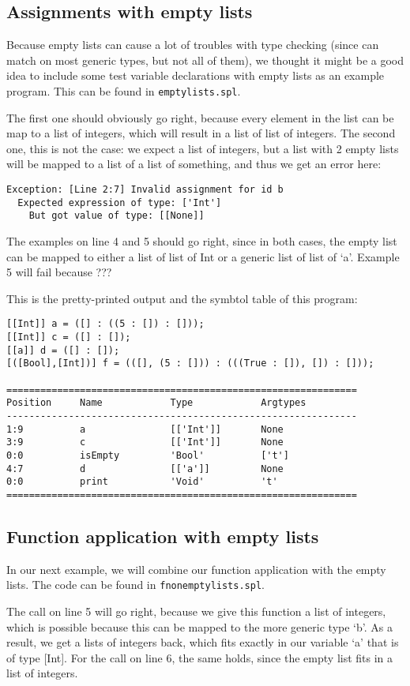 \documentclass[a4paper]{article}
\begin{document}
\subsection{Assignments with empty lists}
Because empty lists can cause a lot of troubles with type checking (since can match on most generic types, but not all of them), we thought it might be a good idea to include some test variable declarations with empty lists as an example program. This can be found in {\tt emptylists.spl}. 

The first one should obviously go right, because every element in the list can be map to a list of integers, which will result in a list of list of integers. The second one, this is not the case: we expect a list of integers, but a list with 2 empty lists will be mapped to a list of a list of something, and thus we get an error here: 
\begin{verbatim}
Exception: [Line 2:7] Invalid assignment for id b
  Expected expression of type: ['Int']
    But got value of type: [[None]]
\end{verbatim}
The examples on line 4 and 5 should go right, since in both cases, the empty list can be mapped to either a list of list of Int or a generic list of list of `a'. Example 5 will fail because ???

This is the pretty-printed output and the symbtol table of this program: 
\begin{verbatim}
[[Int]] a = ([] : ((5 : []) : []));
[[Int]] c = ([] : []);
[[a]] d = ([] : []);
[([Bool],[Int])] f = (([], (5 : [])) : (((True : []), []) : []));

==============================================================
Position     Name            Type            Argtypes            
--------------------------------------------------------------
1:9          a               [['Int']]       None                
3:9          c               [['Int']]       None                
0:0          isEmpty         'Bool'          ['t']               
4:7          d               [['a']]         None                
0:0          print           'Void'          't'                 
==============================================================
\end{verbatim}

\subsection{Function application with empty lists}
In our next example, we will combine our function application with the empty lists. The code can be found in {\tt fnonemptylists.spl}.

The call on line 5 will go right, because we give this function a list of integers, which is possible because this can be mapped to the more generic type `b'. As a result, we get a lists of integers back, which fits exactly in our variable `a' that is of type [Int]. For the call on line 6, the same holds, since the empty list fits in a list of integers. 
\end{document}
